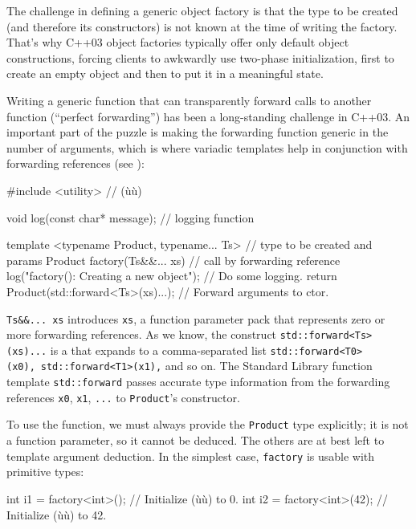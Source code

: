 The challenge in defining a generic object factory is that the type to
be created (and therefore its constructors) is not known at the time of
writing the factory. That's why C++03 object factories typically offer
only default object constructions, forcing clients to awkwardly use
two-phase initialization, first to create an empty object and then to
put it in a meaningful state.

Writing a generic function that can transparently forward calls to
another function (``perfect forwarding'') has been a long-standing
challenge in C++03. An important part of the puzzle is making the
forwarding function generic in the number of arguments, which is where
variadic templates help in conjunction with forwarding references (see
):

\begin{emcppslisting}[emcppsbatch=e35]
#include <utility>  // (ù{}ù)

void log(const char* message);                // logging function

template <typename Product, typename... Ts>   // type to be created and params
Product factory(Ts&&... xs)                   // call by forwarding reference
{
    log("factory(): Creating a new object");  // Do some logging.
    return Product(std::forward<Ts>(xs)...);  // Forward arguments to ctor.
}
\end{emcppslisting}
    

\noindent \lstinline!Ts&&...!~\lstinline!xs! introduces \lstinline!xs!, a function
parameter pack that represents zero or more forwarding references. As we
know, the construct \lstinline!std::forward<Ts>(xs)...! is a  that expands to a comma-separated list
\lstinline!std::forward<T0>(x0),!~\lstinline!std::forward<T1>(x1),! and so on.
The Standard Library function template \lstinline!std::forward! passes
accurate type information from the forwarding references \lstinline!x0!,
\lstinline!x1!, \lstinline!...! to \lstinline!Product!'s constructor.

To use the function, we must always provide the \lstinline!Product! type
explicitly; it is not a function parameter, so it cannot be deduced. The
others are at best left to template argument deduction. In the simplest
case, \lstinline!factory! is usable with primitive types:

\begin{emcppslisting}[emcppsbatch=e35]
int i1 = factory<int>();               // Initialize (ù{}ù) to 0.
int i2 = factory<int>(42);             // Initialize (ù{}ù) to 42.
\end{emcppslisting}
    

